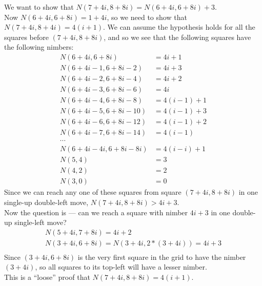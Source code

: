 \documentclass{article}
\begin{document}
We want to show that $N(7 + 4i, 8 + 8i) = N(6 + 4i, 6 + 8i) + 3$. \\
Now $N(6 + 4i, 6 + 8i) = 1 + 4i$, so we need to show that
$N(7 + 4i, 8 + 4i) = 4(i + 1)$.
\newpage
We can assume the hypothesis holds for all the squares before
$(7 + 4i, 8 + 8i)$, and so we see that the following squares have the
following nimbers:
\begin{align*}
N(6 + 4i, 6 + 8i) & = 4i + 1 \\   
N(6 + 4i - 1, 6 + 8i - 2) & = 4i + 3 \\   
N(6 + 4i - 2, 6 + 8i - 4) & = 4i + 2 \\   
N(6 + 4i - 3, 6 + 8i - 6) & = 4i \\
N(6 + 4i - 4, 6 + 8i - 8) & = 4(i - 1) + 1 \\
N(6 + 4i - 5, 6 + 8i - 10) & = 4(i - 1) + 3 \\
N(6 + 4i - 6, 6 + 8i - 12) & = 4(i - 1) + 2 \\
N(6 + 4i - 7, 6 + 8i - 14) & = 4(i - 1) \\
\cdots \\
N(6 + 4i - 4i, 6 + 8i - 8i) & = 4(i - i) + 1 \\
N(5, 4) & = 3 \\
N(4, 2) & = 2 \\
N(3, 0) & = 0
\end{align*}
Since we can reach any one of these squares from square $(7 + 4i, 8 + 8i)$
in one single-up double-left move, $N(7 + 4i, 8 + 8i) > 4i + 3$. \\
Now the question is --- can we reach a square with nimber $4i + 3$ in
one double-up single-left move?
\begin{align*}
  N(5 + 4i, 7 + 8i) = 4i + 2 \\
  N(3 + 4i, 6 + 8i) = N(3 + 4i, 2 * (3 + 4i)) = 4i + 3 \\
\end{align*}
Since $(3 + 4i, 6 + 8i)$ is the very first square in the grid to have
the nimber $(3 + 4i)$, so all squares to its top-left will have a lesser
nimber. \\
This is a ``loose'' proof that $N(7 + 4i, 8 + 8i) = 4(i + 1)$.
\newpage
\end{document}
